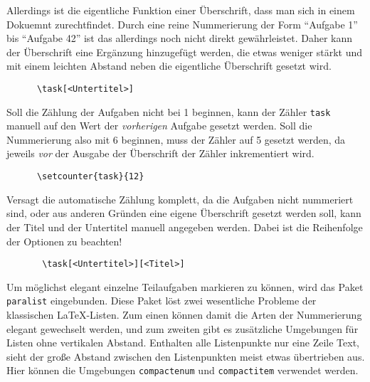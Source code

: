 \documentclass{exercise}
\begin{document}
    Allerdings ist die eigentliche Funktion einer Überschrift, dass man sich in einem Dokuemnt zurechtfindet. Durch eine reine Nummerierung der Form \enquote{Aufgabe 1} bis \enquote{Aufgabe 42} ist das allerdings noch nicht direkt gewährleistet. Daher kann der Überschrift eine Ergänzung hinzugefügt werden, die etwas weniger stärkt und mit einem leichten Abstand neben die eigentliche Überschrift gesetzt wird.
    \begin{verbatim}
      \task[<Untertitel>]
    \end{verbatim}

    Soll die Zählung der Aufgaben nicht bei 1 beginnen, kann der Zähler \texttt{task} manuell auf den Wert der \emph{vorherigen} Aufgabe gesetzt werden. Soll die Nummerierung also mit 6 beginnen, muss der Zähler auf 5 gesetzt werden, da jeweils \emph{vor} der Ausgabe der Überschrift der Zähler inkrementiert wird.
    \begin{verbatim}
      \setcounter{task}{12}
    \end{verbatim}

    Versagt die automatische Zählung komplett, da die Aufgaben nicht nummeriert sind, oder aus anderen Gründen eine eigene Überschrift gesetzt werden soll, kann der Titel und der Untertitel manuell angegeben werden. Dabei ist die Reihenfolge der Optionen zu beachten!
    \begin{verbatim}
       \task[<Untertitel>][<Titel>]
    \end{verbatim}
  
    Um möglichst elegant einzelne Teilaufgaben markieren zu können, wird das Paket \texttt{paralist} \cite{paralist} eingebunden. Diese Paket löst zwei wesentliche Probleme der klassischen \LaTeX{}-Listen. Zum einen können damit die Arten der Nummerierung elegant gewechselt werden, und zum zweiten gibt es zusätzliche Umgebungen für Listen ohne vertikalen Abstand. Enthalten alle Listenpunkte nur eine Zeile Text, sieht der große Abstand zwischen den Listenpunkten meist etwas übertrieben aus. Hier können die Umgebungen \texttt{compactenum} und \texttt{compactitem} verwendet werden.
    
\end{document}
